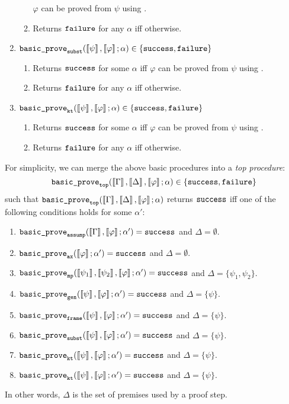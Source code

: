 \documentclass{article}
\begin{document}
\begin{enumerate}
\begin{enumerate}
      $\varphi$ can be proved from $\psi$ using \pruleFrame. 
\item Returns $\cdfail$ for any $\alpha$ iff otherwise.  
\end{enumerate}
\item $\bpsubst(\enpsi, \envarphi ; \alpha) \in \{\cdsucc,\cdfail\}$
\begin{enumerate}
\item Returns $\cdsucc$ for some $\alpha$ iff
      $\varphi$ can be proved from $\psi$ using \pruleSubst. 
\item Returns $\cdfail$ for any $\alpha$ iff otherwise.  
\end{enumerate}
\item $\bpkt(\enpsi, \envarphi ; \alpha) \in \{\cdsucc,\cdfail\}$
\begin{enumerate}
\item Returns $\cdsucc$ for some $\alpha$ iff
      $\varphi$ can be proved from $\psi$ using \pruleKT. 
\item Returns $\cdfail$ for any $\alpha$ iff otherwise.  
\end{enumerate}
\end{enumerate}

For simplicity, we can merge the above basic procedures into 
a \emph{top procedure}:
\begin{equation}
\bptop(\enGamma, \enDelta, \envarphi ; \alpha) \in \{\cdsucc,\cdfail\}
\end{equation}
such that
$\bptop(\enGamma, \enDelta, \envarphi ; \alpha)$ returns $\cdsucc$ iff
one of the following conditions holds for some $\alpha'$:
\begin{enumerate}
\item $\bpassump(\enGamma, \envarphi ; \alpha') = \cdsucc$
      and $\Delta = \emptyset$.
\item $\bpax(\envarphi; \alpha') = \cdsucc$
      and $\Delta = \emptyset$.
\item $\bpmp(\enpsin{1}, \enpsin{2}, \envarphi ; \alpha') = \cdsucc$
      and $\Delta = \{\psi_1,\psi_2\}$.
\item $\bpgen(\enpsi, \envarphi ; \alpha') = \cdsucc$
      and $\Delta = \{\psi\}$.
\item $\bpframe(\enpsi, \envarphi ; \alpha') = \cdsucc$
      and $\Delta = \{\psi\}$.
\item $\bpsubst(\enpsi, \envarphi ; \alpha') = \cdsucc$
      and $\Delta = \{\psi\}$.
\item $\bpkt(\enpsi, \envarphi ; \alpha') = \cdsucc$
      and $\Delta = \{\psi\}$.
\item $\bpkt(\enpsi, \envarphi ; \alpha') = \cdsucc$
      and $\Delta = \{\psi\}$.
\end{enumerate}
In other words, $\Delta$ is the set of premises used by a proof step. 
\end{document}
